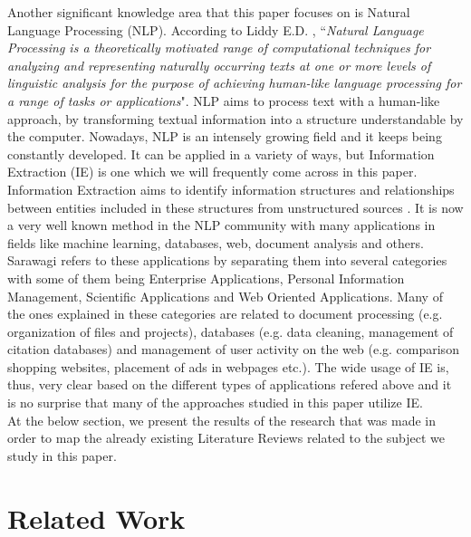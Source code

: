 Another significant knowledge area that this paper focuses on is Natural Language Processing (NLP). According to Liddy E.D. \cite{liddy2001natural}, ``\emph{Natural Language Processing is a theoretically motivated 
range of computational techniques for analyzing and representing naturally occurring texts at one or more levels of linguistic analysis for the purpose of achieving human-like language processing for a 
range of tasks or applications}". NLP aims to process text with a human-like approach, by transforming textual information into a structure understandable by the computer. Nowadays, NLP is an intensely growing 
field and it keeps being constantly developed. It can be applied in a variety of ways, but Information Extraction (IE) is one which we will frequently come across in this paper. \\

Information Extraction aims to identify information structures and relationships between entities included in these structures from unstructured sources \cite{infoextraction}. It is now a very well known 
method in the NLP community with many applications in fields like machine learning, databases, web, document analysis and others. Sarawagi \cite{infoextraction} refers to these applications by separating them 
into several categories with some of them being Enterprise Applications, Personal Information Management, Scientific Applications and Web Oriented Applications. Many of the ones explained in these categories 
are related to document processing (e.g. organization of files and projects), databases (e.g. data cleaning, management of citation databases) and management of user activity on the web (e.g. comparison shopping 
websites, placement of ads in webpages etc.). The wide usage of IE is, thus, very clear based on the different types of applications refered above and it is no surprise that many of the approaches studied in 
this paper utilize IE. \\

At the below section, we present the results of the research that was made in order to map the already existing Literature Reviews related to the subject we study in this paper.

\section{Related Work}

